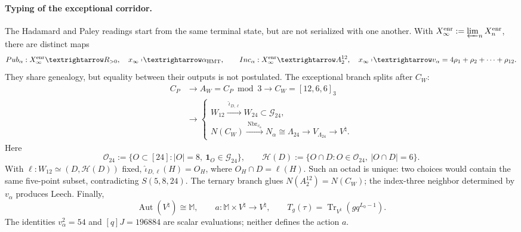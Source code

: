 \paragraph{Typing of the exceptional corridor.}
The Hadamard and Paley readings start from the same terminal state, but are not
serialized with one another. With
\(X_\infty^{\rm enr}:=\varprojlim_nX_n^{\rm enr}\), there are distinct maps
\begin{equation}
 \operatorname{Pub}_\alpha:X_\infty^{\rm enr}\longrightarrow\mathbb R_{>0},
 \quad x_\infty\longmapsto\alpha_{\rm HMT},
 \qquad
 \operatorname{Inc}_\alpha:X_\infty^{\rm enr}\longrightarrow A_2^{12},
 \quad x_\infty\longmapsto
 v_\alpha=4\rho_1+\rho_2+\cdots+\rho_{12}.
 \label{eq:frontal-dos-publicaciones-alpha}
\end{equation}
They share genealogy, but equality between their outputs is not postulated. The exceptional
branch splits after \(C_W\):
\begin{equation}
 \begin{aligned}
 C_P&\longrightarrow A_W=C_P\bmod3\longrightarrow
 C_W=[12,6,6]_3\\
 &\longrightarrow
 \begin{cases}
 W_{12}\xrightarrow{\ \widehat\iota_{D,\ell}\ }
 W_{24}\subset\mathcal G_{24},\\[2pt]
 N(C_W)\xrightarrow{\ \operatorname{Nbr}_{v_\alpha}\ }
 N_\alpha\cong\Lambda_{24}\longrightarrow
 V_{\Lambda_{24}}\longrightarrow V^\natural .
 \end{cases}
 \end{aligned}
 \label{eq:frontal-cadena-excepcional}
\end{equation}
Here
\begin{equation}
 \mathcal O_{24}:=\{O\subset[24]:|O|=8,\ \mathbf1_O\in\mathcal G_{24}\},
 \qquad
 \mathcal H(D):=\{O\cap D:O\in\mathcal O_{24},\ |O\cap D|=6\}.
 \label{eq:frontal-octadas-hexadas-dodecada}
\end{equation}
With \(\ell:W_{12}\simeq(D,\mathcal H(D))\) fixed,
\(\widehat\iota_{D,\ell}(H)=O_H\), where
\(O_H\cap D=\ell(H)\). Such an octad is unique: two choices would contain the
same five-point subset, contradicting \(S(5,8,24)\). The ternary
branch glues \(N(A_2^{12})=N(C_W)\); the index-three neighbor determined
by \(v_\alpha\) produces Leech. Finally,
\begin{equation}
 \operatorname{Aut}(V^\natural)\cong\mathbb M,\qquad
 a:\mathbb M\times V^\natural\longrightarrow V^\natural,\qquad
 T_g(\tau)=\operatorname{Tr}_{V^\natural}(gq^{L_0-1}).
 \label{eq:frontal-accion-monstruo}
\end{equation}
The identities \(v_\alpha^2=54\) and \([q]J=196884\) are scalar
evaluations; neither defines the action \(a\).


